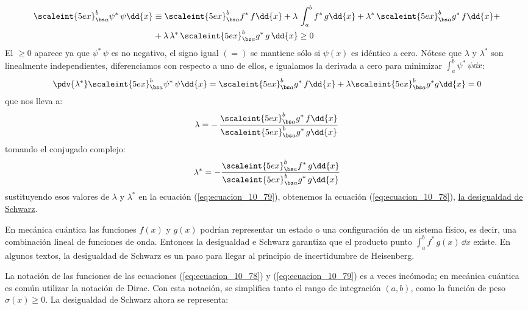 \begin{align}
\begin{aligned}
\scaleint{5ex}_{\bs a}^{b} \psi^{*} \, \psi \dd{x} &\equiv \scaleint{5ex}_{\bs a}^{b} f^{*} \, f \dd{x} + \lambda \, \int_{a}^{b} f^{*} \, g \dd{x} + \lambda^{*} \, \scaleint{5ex}_{\bs a}^{b} g^{*} \, f \dd{x} + \\
&+ \lambda \, \lambda^{*} \, \scaleint{5ex}_{\bs a}^{b} g^{*} \, g \, \dd{x}  \geq 0
\end{aligned}
\label{eq:ecuacion_10_79}
\end{align}
El $\geq 0$ aparece ya que $\psi^{*} \, \psi$ es no negativo, el signo igual $(=)$ se mantiene sólo si $\psi (x)$ es idéntico a cero. Nótese que $\lambda$ y $\lambda^{*}$ son linealmente independientes, diferenciamos con respecto a uno de ellos, e igualamos la derivada a cero para minimizar $\displaystyle \int_{a}^{b} \psi^{*} \, \psi \dd{x}$:
\begin{align*}
\pdv{\lambda^{*}} \scaleint{5ex}_{\bs a}^{b} \psi^{*} \, \psi \dd{x} = \scaleint{5ex}_{\bs a}^{b} g^{*} \, f \dd{x}  + \lambda \scaleint{5ex}_{\bs a}^{b} g^{*} g \dd{x} = 0
\end{align*}
que nos lleva a:
\begin{align}
\lambda = - \, \dfrac{\displaystyle \scaleint{5ex}_{\bs a}^{b} g^{*} \, f \dd{x}}{\displaystyle \scaleint{5ex}_{\bs a}^{b} g^{*} \, g \dd{x}}
\label{eq:ecuacion_10_80a}
\end{align}
tomando el conjugado complejo: 
\begin{align}
\lambda^{*} = - \dfrac{\displaystyle \scaleint{5ex}_{\bs a}^{b} f^{*} \, g \dd{x}}{\displaystyle \scaleint{5ex}_{\bs a}^{b} g^{*} \, g \dd{x}}
\label{eq:ecuacion_80b}
\end{align}
sustituyendo esos valores de $\lambda$ y $\lambda^{*}$ en la ecuación (\ref{eq:ecuacion_10_79}), obtenemos la ecuación (\ref{eq:ecuacion_10_78}), \underline{la desigualdad de Schwarz}.
\par
En mecánica cuántica las funciones $f(x)$ y $g(x)$ podrían representar un estado o una configuración de un sistema físico, es decir, una combinación lineal de funciones de onda. Entonces la desigualdad e Schwarz garantiza que el producto punto $\displaystyle \int_{a}^{b} f^{*} \, g(x) \, \dd{x}$ existe. En algunos textos, la desigualdad de Schwarz es un paso para llegar al principio de incertidumbre de Heisenberg.
\par
La notación de las funciones de las ecuaciones (\ref{eq:ecuacion_10_78}) y (\ref{eq:ecuacion_10_79}) es a veces incómoda; en mecánica cuántica es común utilizar la notación de Dirac. Con esta notación, se simplifica tanto el rango de integración $(a, b)$, como la función de peso $\sigma (x) \geq 0$. La desigualdad de Schwarz ahora se representa:
